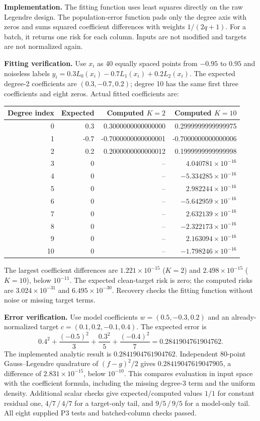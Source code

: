 \textbf{Implementation.} The fitting function uses least squares directly on the raw Legendre design. The population-error function pads only the degree axis with zeros and sums squared coefficient differences with weights $1/(2q+1)$. For a batch, it returns one risk for each column. Inputs are not modified and targets are not normalized again.

\textbf{Fitting verification.} Use $x_i$ as 40 equally spaced points from $-0.95$ to $0.95$ and noiseless labels $y_i=0.3L_0(x_i)-0.7L_1(x_i)+0.2L_2(x_i)$. The expected degree-2 coefficients are $(0.3,-0.7,0.2)$; degree 10 has the same first three coefficients and eight zeros. Actual fitted coefficients are:
\begin{center}\small
\begin{tabular}{@{}rrrr@{}}\toprule
Degree index & Expected & Computed $K=2$ & Computed $K=10$\\\midrule
0 & 0.3 & 0.3000000000000000 & 0.2999999999999975\\
1 & -0.7 & -0.7000000000000001 & -0.7000000000000006\\
2 & 0.2 & 0.2000000000000012 & 0.1999999999999998\\
3 & 0 & -- & $4.040781\times10^{-16}$\\
4 & 0 & -- & $-5.334285\times10^{-16}$\\
5 & 0 & -- & $2.982244\times10^{-16}$\\
6 & 0 & -- & $-5.642959\times10^{-16}$\\
7 & 0 & -- & $2.632139\times10^{-16}$\\
8 & 0 & -- & $-2.322173\times10^{-16}$\\
9 & 0 & -- & $2.163094\times10^{-16}$\\
10 & 0 & -- & $-1.798246\times10^{-16}$\\
\bottomrule\end{tabular}\end{center}
The largest coefficient differences are $1.221\times10^{-15}$ ($K=2$) and $2.498\times10^{-15}$ ($K=10$), below $10^{-11}$. The expected clean-target risk is zero; the computed risks are $3.024\times10^{-31}$ and $6.495\times10^{-30}$. Recovery checks the fitting function without noise or missing target terms.

\textbf{Error verification.} Use model coefficients $w=(0.5,-0.3,0.2)$ and an already-normalized target $c=(0.1,0.2,-0.1,0.4)$. The expected error is
\[
0.4^2+\frac{(-0.5)^2}{3}+\frac{0.3^2}{5}+\frac{(-0.4)^2}{7}
=0.2841904761904762.
\]
The implemented analytic result is $0.2841904761904762$. Independent 80-point Gauss--Legendre quadrature of $(f-g)^2/2$ gives $0.28419047619047905$, a difference of $2.831\times10^{-15}$, below $10^{-10}$. This compares evaluation in input space with the coefficient formula, including the missing degree-3 term and the uniform density. Additional scalar checks give expected/computed values $1/1$ for constant residual one, $4/7\,/\,4/7$ for a target-only tail, and $9/5\,/\,9/5$ for a model-only tail. All eight supplied P3 tests and batched-column checks passed.


